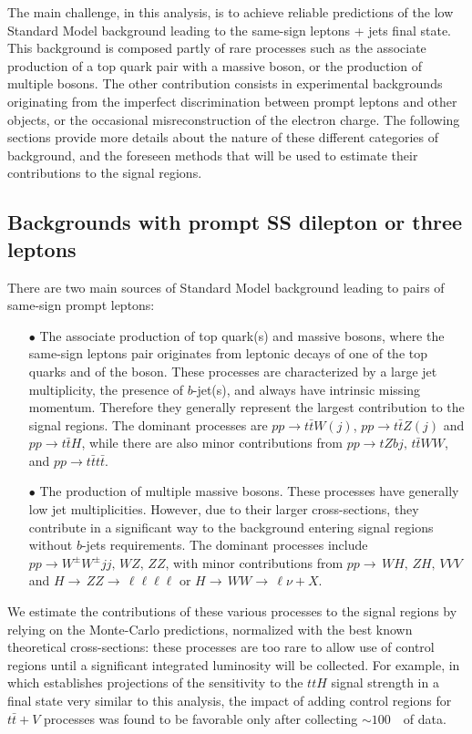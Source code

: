 The main challenge, in this analysis, is to achieve reliable predictions of the low Standard Model background 
leading to the same-sign leptons + jets final state. 
This background is composed partly of rare processes such as the associate production of a top quark pair with a massive boson, 
or the production of multiple bosons. 
The other contribution consists in experimental backgrounds originating from the imperfect discrimination between prompt leptons and other objects, 
or the occasional misreconstruction of the electron charge. 
The following sections provide more details about the nature of these different categories of background, 
and the foreseen methods that will be used to estimate their contributions to the signal regions. 

\subsection{Backgrounds with prompt SS dilepton or three leptons}
\label{sec:bkg_prompt}

There are two main sources of Standard Model background leading to pairs of same-sign prompt leptons: 
\begin{itemize}
\item[$\bullet$] The associate production of top quark(s) and massive bosons, where the same-sign leptons pair 
originates from leptonic decays of one of the top quarks and of the boson. 
These processes are characterized by a large jet multiplicity, the presence of $b$-jet(s), 
and always have intrinsic missing momentum. 
Therefore they generally represent the largest contribution to the signal regions. 
The dominant processes are $pp\to t\bar{t}W(j)$, $pp\to t\bar{t}Z(j)$ and $pp\to t\bar{t}H$, 
while there are also minor contributions from $pp\to tZbj,\,t\bar{t}WW$, and $pp\to t\bar{t}t\bar{t}$. 
\item[$\bullet$] The production of multiple massive bosons. 
These processes have generally low jet multiplicities. 
However, due to their larger cross-sections, they contribute in a significant way to the background entering signal regions without $b$-jets requirements. 
The dominant processes include $pp\to W^\pm W^\pm jj,\,WZ,\,ZZ$, 
with minor contributions from $pp\to\,WH,\,ZH,\,VVV$ and $H\to\,ZZ\to\,\ell\ell\ell\ell$ or $H\to\,WW\to\,\ell\nu +X$. 
\end{itemize}

We estimate the contributions of these various processes to the signal regions by relying on the Monte-Carlo predictions, 
normalized with the best known theoretical cross-sections: these processes are too rare to allow use of control regions until a significant integrated luminosity will be collected. 
For example, in~\cite{Ducu:2021084} which establishes projections of the sensitivity 
to the $ttH$ signal strength in a final state very similar to this analysis, 
the impact of adding control regions for $t\bar t+V$ processes was found to be favorable only after collecting $\sim 100$~\ifb~of data. 

